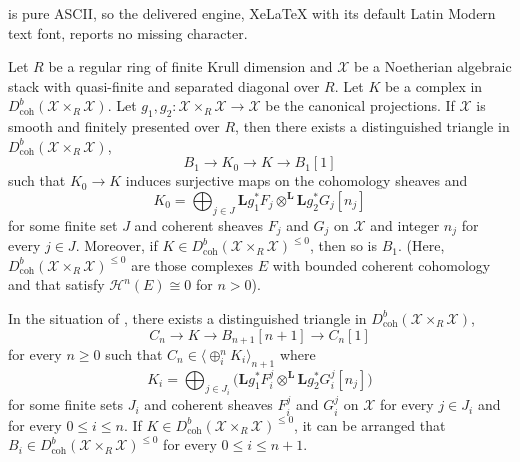 \documentclass[10pt,a4paper]{amsart}
\begin{document}
is pure ASCII, so the delivered engine, XeLaTeX with its default Latin Modern text font, reports no missing character.
\begin{lemma}
    \label{lem:derived_resolution_of_the_diagonal}
    Let $R$ be a regular ring of finite Krull dimension and $\mathcal{X}$ be a Noetherian algebraic stack with quasi-finite and separated diagonal over $R$. Let $K$ be a complex in $D_{\operatorname{coh}}^b(\mathcal{X}\times_R\mathcal{X})$. Let $g_1,g_2\colon \mathcal{X}\times_R\mathcal{X}\to\mathcal{X}$ be the canonical projections. If $\mathcal{X}$ is smooth and finitely presented over $R$, then there exists a distinguished triangle in $D_{\operatorname{coh}}^b(\mathcal{X}\times_R\mathcal{X})$,
    \begin{displaymath}
        B_1\longrightarrow K_0\longrightarrow K\longrightarrow B_1[1]
    \end{displaymath}
    such that $K_0\to K$ induces surjective maps on the cohomology sheaves and
    \begin{displaymath}
        K_0=\bigoplus_{j\in J}\mathbf{L}g_1^\ast F_j\otimes^{\mathbf{L}}\mathbf{L}g_2^\ast G_j[n_j]
    \end{displaymath}
    for some finite set $J$ and coherent sheaves $F_j$ and $G_j$ on $\mathcal{X}$ and integer $n_j$ for every $j\in J$. Moreover, if $K\in D_{\operatorname{coh}}^b(\mathcal{X}\times_R\mathcal{X})^{\leq 0}$, then so is $B_1$. (Here, $D_{\operatorname{coh}}^b(\mathcal{X}\times_R\mathcal{X})^{\leq 0}$ are those complexes $E$ with bounded coherent cohomology and that satisfy $\mathcal{H}^n (E) \cong 0$ for $n>0$).
\end{lemma}

\begin{corollary}
    \label{cor:derived_resolution}
    In the situation of , there exists a distinguished triangle in $D_{\operatorname{coh}}^b(\mathcal{X}\times_R\mathcal{X})$,
    \begin{displaymath}
        C_n\longrightarrow K\longrightarrow B_{n+1}[n+1]\longrightarrow C_n[1]
    \end{displaymath}
    for every $n\geq 0$ such that $C_n\in\langle\oplus_i^{n} K_i \rangle_{n+1}$ where
    \begin{displaymath}
        K_i=\bigoplus_{j\in J_{i}}\bigg(\mathbf{L}g_1^\ast F_i^j\otimes^{\mathbf{L}}\mathbf{L}g_2^\ast G_i^j[n_j]\bigg)
    \end{displaymath}
    for some finite sets $J_i$ and coherent sheaves $F_i^j$ and $G_i^j$ on $\mathcal{X}$ for every $j\in J_i$ and for every $0\leq i\leq n$. If $K\in D_{\operatorname{coh}}^b(\mathcal{X}\times_R\mathcal{X})^{\leq 0}$, it can be arranged that $B_i\in D_{\operatorname{coh}}^b(\mathcal{X}\times_R\mathcal{X})^{\leq 0}$ for every $0\leq i\leq n+1$.
\end{corollary}
\end{document}
